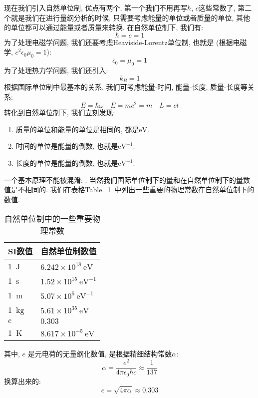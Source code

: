 现在我们引入自然单位制, 优点有两个, 第一个我们不用再写$\hbar$, $c$这些常数了, 第二个就是我们在进行量纲分析的时候, 只需要考虑能量的单位或者质量的单位, 其他的单位都可以通过能量或者质量来转换.
在自然单位制下, 我们有:
\begin{equation}
  \hbar = c = 1
\end{equation}
为了处理电磁学问题, 我们还要考虑Heaviside-Lorentz单位制, 也就是 (根据电磁学, $c^2 \epsilon_0 \mu_0 = 1$):
\begin{equation}
  \epsilon_0 = \mu_0 = 1
\end{equation}
为了处理热力学问题, 我们还引入:
\begin{equation}
  k_B = 1
\end{equation}
根据国际单位制中最基本的关系, 我们可考虑能量-时间, 能量-长度, 质量-长度等关系:
\begin{equation}
  E = \hbar \omega  \quad E = m c^2 = m \quad L=c t
\end{equation}
转化到自然单位制下, 我们立刻发现:
\begin{enumerate}
\item 质量的单位和能量的单位是相同的, 都是$\mathrm{eV}$.
\item 时间的单位是能量的倒数, 也就是$\mathrm{eV}^{-1}$.
\item 长度的单位是能量的倒数, 也就是$\mathrm{eV}^{-1}$.
\end{enumerate}
一个基本原理不能被混淆: .
当然我们国际单位制下的量和在自然单位制下的量数值是不相同的.
我们在表格Table.~\ref{tab:natural_units_physical_constants}~中列出一些重要的物理常数在自然单位制下的数值.
\begin{table}[h!]
\centering
\begin{tabular}{|l|l|}
  \hline
  SI数值 & 自然单位制数值 \\
  \hline
  1~$\mathrm{J}$ & $6.242 \times 10^{18}~\mathrm{eV}$ \\
  1~$\mathrm{s}$ & $1.52 \times 10^{15}~\mathrm{eV}^{-1}$ \\
  1~$\mathrm{m}$ & $5.07 \times 10^{6}~\mathrm{eV}^{-1}$ \\
  1~$\mathrm{kg}$ & $5.61 \times 10^{35}~\mathrm{eV}$ \\
  $e$ & $0.303$ \\
  1~$\mathrm{K}$ & $8.617 \times 10^{-5}~\mathrm{eV}$ \\
  \hline
\end{tabular}
\caption{自然单位制中的一些重要物理常数}
\label{tab:natural_units_physical_constants}
\end{table}
其中, $e$ 是元电荷的无量纲化数值, 是根据精细结构常数$\alpha$:
\begin{equation}
  \alpha = \frac{e^2}{4\pi\epsilon_0 \hbar c} \approx \frac{1}{137}
\end{equation}
换算出来的:
\begin{equation}
  e = \sqrt{4\pi\alpha} \approx 0.303
\end{equation}


